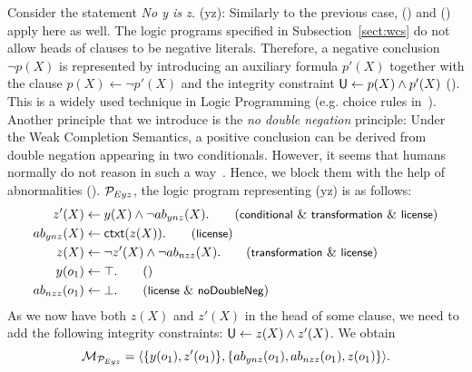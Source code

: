 \documentclass[12pt]{article}
\begin{document}
Consider the statement \textit{No y is z.} ({\ME yz}):
Similarly to the previous case, (\licenses) and () apply here
as well.
The logic programs specified in Subsection~\ref{sect:wcs} 
do not allow heads of clauses to be negative literals. Therefore, a negative conclusion~$\neg p(X)$ is represented
by introducing an auxiliary formula $p'(X)$ together with the clause $p(X) \leftarrow \neg p'(X)$ and the integrity constraint $\mathsf{U} \leftarrow p(X) \wedge p'(X)$ (\transformation). This is a widely used technique in Logic Programming (e.g. choice rules in~\cite{GebserKaminskiKaufmannSchaub12}). 
Another principle that we introduce is the \emph{no double negation} principle: Under the Weak Completion Semantics, a positive conclusion can be derived from double negation appearing in two conditionals. However, it seems that humans normally do not reason in such a way~\cite{khemlani:2012}. Hence, we block them with the help of abnormalities (\dnegation). ${\cal P}_{Eyz}$, the logic program representing (\ME yz) is as follows:
\begin{align}
 z'(X) & \leftarrow y(X) \wedge \neg \Ab_{ynz}(X).  \tag{\conditionals\ \&\ \transformation\ \&\  \licenses} \\
\Ab_{ynz}(X)  & \leftarrow \cxt(z(X)).\tag{\licenses} \\
z(X) & \leftarrow \neg z'(X) \wedge \neg \Ab_{nzz}(X). \tag{\transformation\ \&\ \licenses} \\
y(o_1) & \leftarrow \top. \tag{} \\
\Ab_{nzz}(o_1) & \leftarrow \bot. \tag{\licenses\ \&\  \dnegation}
\end{align}
As we now have both $z(X)$ and $z'(X)$ in the head of some clause, we need to add the 
following integrity constraints: $\mathsf{U} \leftarrow z(X) \wedge
z'(X)$. We obtain 
\[{\cal M}_{{\cal P}_{Eyz}} = \langle \{y(o_1), z'(o_1)\},\{ab_{ynz}(o_1), ab_{nzz}(o_1),  z(o_1)\}
\rangle.
\]
\end{document}
